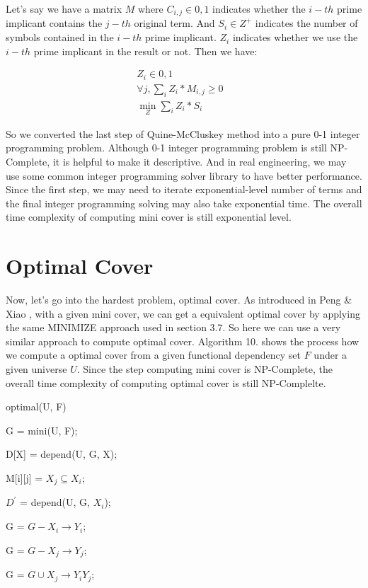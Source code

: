 \documentclass[11pt]{book}
\begin{document}
Let's say we have a matrix $M$ where $C_{i, j} \in {0, 1}$ indicates whether the $i-th$ prime implicant contains the $j-th$ original term. And $S_{i} \in Z^{+}$ indicates the number of symbols contained in the $i-th$ prime implicant. $Z_i$ indicates whether we use the $i-th$ prime implicant in the result or not. Then we have:

\begin{align}
	Z_i \in {0, 1} & \\
	\forall j, \sum_{i} Z_i * M_{i, j} \geq 0 \\
	\min_{Z} \sum_{i} Z_i * S_{i}		 
\end{align}

So we converted the last step of Quine-McCluskey method into a pure 0-1 integer programming problem. Although 0-1 integer programming problem is still NP-Complete, it is helpful to make it descriptive. And in real engineering, we may use some common integer programming solver library to have better performance. Since the first step, we may need to iterate exponential-level number of terms and the final integer programming solving may also take exponential time. The overall time complexity of computing mini cover is still exponential level.

\section{Optimal Cover}

Now, let's go into the hardest problem, optimal cover. As introduced in Peng \& Xiao \cite{peng2016optimal}, with a given mini cover, we can get a equivalent optimal cover by applying the same MINIMIZE approach used in section 3.7. So here we can use a very similar approach to compute optimal cover. Algorithm 10. shows the process how we compute a optimal cover from a given functional dependency set $F$ under a given universe $U$. Since the step computing mini cover is NP-Complete,
the overall time complexity of computing optimal cover is still NP-Complelte.

\begin{algorithm}
  \caption{optimal(U, F)}
  
  \SetAlgoLined
  
  G = mini(U, F);
  
   {
  	D[X] = depend(U, G, X);
  }
  
   {
  	 {
  	  M[i][j] = $X_j \subseteq X_i$;  	
  	}
  }
  
   {
    $D^{'}$ = depend(U, G, $X_i$);
    
     {
       {
      	G = $G - {X_i \rightarrow Y_i}$;
      	
      	G = $G - {X_j \rightarrow Y_j}$;

      	G = $G \cup {X_j \rightarrow Y_iY_j}$;
      }
    }    
  }
\end{algorithm}
\end{document}
